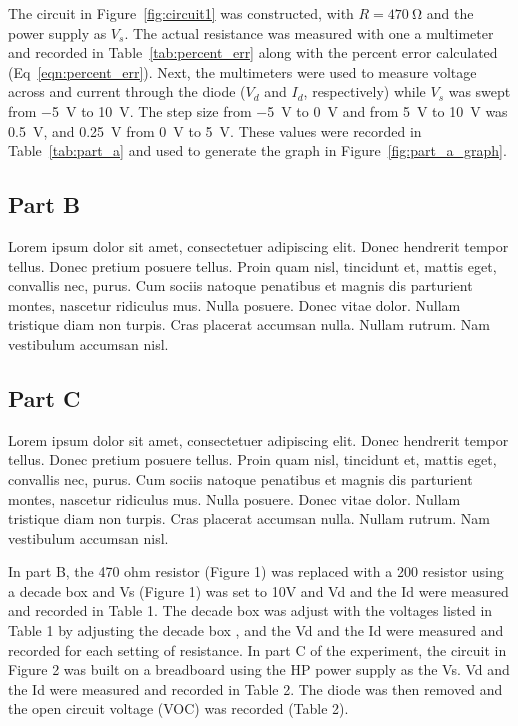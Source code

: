 \documentclass{article}
\begin{document}
The circuit in Figure~\ref{fig:circuit1} was constructed, with $R =
\SI{470}{\ohm}$ and the power supply as $V_s$.  The actual resistance
was measured with one a multimeter and recorded in
Table~\ref{tab:percent_err} along with the percent error calculated
(Eq~\ref{eqn:percent_err}).  Next, the multimeters were used to
measure voltage across and current through the diode ($V_d$ and $I_d$,
respectively) while $V_s$ was swept from \SI{-5}{V} to \SI{+10}{V}.
The step size from \SI{-5}{V} to \SI{0}{V} and from \SI{5}{V} to
\SI{10}{V} was \SI{0.5}{V}, and \SI{0.25}{V} from \SI{0}{V} to
\SI{5}{V}.  These values were recorded in Table~\ref{tab:part_a} and
used to generate the graph in Figure~\ref{fig:part_a_graph}.

\subsection{Part B}
\label{sec:proc_b}

Lorem ipsum dolor sit amet, consectetuer adipiscing elit. Donec
hendrerit tempor tellus. Donec pretium posuere tellus. Proin quam
nisl, tincidunt et, mattis eget, convallis nec, purus. Cum sociis
natoque penatibus et magnis dis parturient montes, nascetur ridiculus
mus. Nulla posuere. Donec vitae dolor. Nullam tristique diam non
turpis. Cras placerat accumsan nulla. Nullam rutrum. Nam vestibulum
accumsan nisl.

\subsection{Part C}
\label{sec:proc_c}

Lorem ipsum dolor sit amet, consectetuer adipiscing elit. Donec
hendrerit tempor tellus. Donec pretium posuere tellus. Proin quam
nisl, tincidunt et, mattis eget, convallis nec, purus. Cum sociis
natoque penatibus et magnis dis parturient montes, nascetur ridiculus
mus. Nulla posuere. Donec vitae dolor. Nullam tristique diam non
turpis. Cras placerat accumsan nulla. Nullam rutrum. Nam vestibulum
accumsan nisl.

In part B, the 470 ohm resistor (Figure 1) was replaced with
a 200 resistor using a decade box and Vs (Figure 1) was set to 10V and
Vd and the Id were measured and recorded in Table 1. The decade box
was adjust with the voltages listed in Table 1 by adjusting the decade
box , and the Vd and the Id were measured and recorded for each
setting of resistance.  In part C of the experiment, the circuit in
Figure 2 was built on a breadboard using the HP power supply as the
Vs. Vd and the Id were measured and recorded in Table 2. The diode was
then removed and the open circuit voltage (VOC) was recorded (Table
2).
\end{document}
